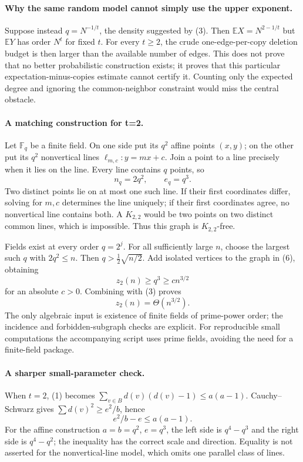 \documentclass[11pt]{article}
\begin{document}
\paragraph{Why the same random model cannot simply use the upper exponent.}
Suppose instead $q=N^{-1/t}$, the density suggested by (3).
Then $\mathbb EX=N^{2-1/t}$ but
$\mathbb EY$ has order $N^t$ for fixed $t$.
For every $t\ge2$, the crude one-edge-per-copy deletion budget is then
larger than the available number of edges. This does not prove that
no better probabilistic construction exists; it proves that this
particular expectation-minus-copies estimate cannot certify it.
Counting only the expected degree and ignoring the common-neighbor
constraint would miss the central obstacle.

\paragraph{A matching construction for t=2.}
Let $\mathbb F_q$ be a finite field. On one side put its $q^2$ affine
points $(x,y)$; on the other put its $q^2$ nonvertical lines
$\ell_{m,c}: y=mx+c$. Join a point to a line precisely when it lies
on the line. Every line contains $q$ points, so
\[
                         n_q=2q^2,\qquad e_q=q^3.        \tag{6}
\]
Two distinct points lie on at most one such line. If their first
coordinates differ, solving for $m,c$ determines the line uniquely;
if their first coordinates agree, no nonvertical line contains both.
A $K_{2,2}$ would be two points on two distinct common lines, which is
impossible. Thus this graph is $K_{2,2}$-free.

Fields exist at every order $q=2^j$. For all sufficiently large $n$,
choose the largest such $q$ with $2q^2\le n$. Then
$q>\tfrac12\sqrt{n/2}$. Add isolated vertices to the graph in (6),
obtaining
\[
                         z_2(n)\ge q^3\ge c n^{3/2}
\]
for an absolute $c>0$. Combining with (3) proves
\[
                              z_2(n)=\Theta(n^{3/2}).    \tag{7}
\]
The only algebraic input is existence of finite fields of prime-power
order; the incidence and forbidden-subgraph checks are explicit.
For reproducible small computations the accompanying script uses prime
fields, avoiding the need for a finite-field package.

\paragraph{A sharper small-parameter check.}
When $t=2$, (1) becomes
$\sum_{v\in B}d(v)(d(v)-1)\le a(a-1)$.
Cauchy--Schwarz gives $\sum d(v)^2\ge e^2/b$, hence
\[
                         e^2/b-e\le a(a-1).             \tag{8}
\]
For the affine construction $a=b=q^2$, $e=q^3$, the left side is
$q^4-q^3$ and the right side is $q^4-q^2$; the inequality has the
correct scale and direction. Equality is not asserted for the
nonvertical-line model, which omits one parallel class of lines.
\end{document}
